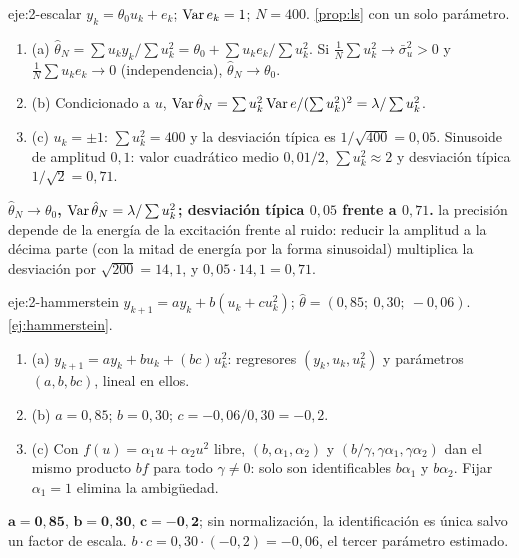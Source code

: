 \begin{solucion}{eje:2-escalar}
\datos $y_k=\theta_0u_k+e_k$; $\operatorname{Var} e_k=1$; $N=400$.
\planteamiento \cref{prop:ls} con un solo parámetro.
\pasos
\begin{enumerate}[label=\arabic*.]
  \item (a) $\hat\theta_N=\sum u_ky_k/\sum u_k^{2}=\theta_0+\sum u_ke_k/\sum u_k^{2}$. Si $\frac1N\sum u_k^{2}\to\bar\sigma_u^{2}>0$ y $\frac1N\sum u_ke_k\to0$ (independencia), $\hat\theta_N\to\theta_0$.
  \item (b) Condicionado a $u$, $\operatorname{Var}\hat\theta_N=\sum u_k^{2}\operatorname{Var} e/(\sum u_k^{2})^{2}=\lambda/\sum u_k^{2}$.
  \item (c) $u_k=\pm1$: $\sum u_k^{2}=400$ y la desviación típica es $1/\sqrt{400}=0{,}05$. Sinusoide de amplitud $0{,}1$: valor cuadrático medio $0{,}01/2$, $\sum u_k^{2}\approx2$ y desviación típica $1/\sqrt2=0{,}71$.
\end{enumerate}
\resultado \textbf{$\hat\theta_N\to\theta_0$, $\operatorname{Var}\hat\theta_N=\lambda/\sum u_k^{2}$; desviación típica $0{,}05$ frente a $0{,}71$.}
\comprobacion la precisión depende de la energía de la excitación frente al ruido: reducir la amplitud a la décima parte (con la mitad de energía por la forma sinusoidal) multiplica la desviación por $\sqrt{200}=14{,}1$, y $0{,}05\cdot14{,}1=0{,}71$.
\end{solucion}

\begin{solucion}{eje:2-hammerstein}
\datos $y_{k+1}=ay_k+b(u_k+cu_k^{2})$; $\hat\theta=(0{,}85;\ 0{,}30;\ -0{,}06)$.
\planteamiento \cref{ej:hammerstein}.
\pasos
\begin{enumerate}[label=\arabic*.]
  \item (a) $y_{k+1}=ay_k+bu_k+(bc)u_k^{2}$: regresores $(y_k,u_k,u_k^{2})$ y parámetros $(a,b,bc)$, lineal en ellos.
  \item (b) $a=0{,}85$; $b=0{,}30$; $c=-0{,}06/0{,}30=-0{,}2$.
  \item (c) Con $f(u)=\alpha_1u+\alpha_2u^{2}$ libre, $(b,\alpha_1,\alpha_2)$ y $(b/\gamma,\gamma\alpha_1,\gamma\alpha_2)$ dan el mismo producto $bf$ para todo $\gamma\ne0$: solo son identificables $b\alpha_1$ y $b\alpha_2$. Fijar $\alpha_1=1$ elimina la ambigüedad.
\end{enumerate}
\resultado $\mathbf{a=0{,}85}$, $\mathbf{b=0{,}30}$, $\mathbf{c=-0{,}2}$; sin normalización, la identificación es única salvo un factor de escala.
\comprobacion $b\cdot c=0{,}30\cdot(-0{,}2)=-0{,}06$, el tercer parámetro estimado.
\end{solucion}

